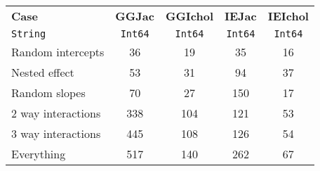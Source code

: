 \begin{tabular}{lcccc}
  \textbf{Case} & \textbf{GGJac} & \textbf{GGIchol} & \textbf{IEJac} & \textbf{IEIchol} \\
  \texttt{String} & \texttt{Int64} & \texttt{Int64} & \texttt{Int64} & \texttt{Int64} \\\hline
  Random intercepts & 36 & 19 & 35 & 16 \\\hline
  Nested effect & 53 & 31 & 94 & 37 \\\hline
  Random slopes & 70 & 27 & 150 & 17 \\\hline
  2 way interactions & 338 & 104 & 121 & 53 \\\hline
  3 way interactions & 445 & 108 & 126 & 54 \\\hline
  Everything & 517 & 140 & 262 & 67 \\\hline\hline
\end{tabular}
